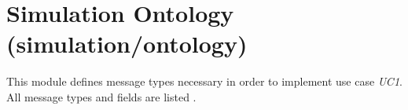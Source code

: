 \section{Simulation Ontology (simulation/ontology)}
This module defines message types necessary in order to implement use case \textit{UC1}. All message types and fields are listed .